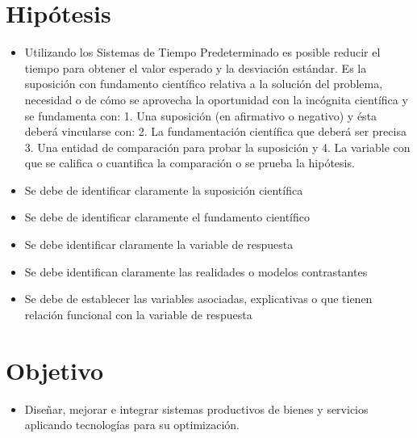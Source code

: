     \section{Hipótesis}
    
    \begin{itemize}
    \item Utilizando los Sistemas de Tiempo Predeterminado es posible reducir el tiempo para obtener el valor esperado y la desviación estándar.
    Es la suposición con fundamento científico relativa a la solución del problema, necesidad o de cómo se aprovecha la oportunidad con la incógnita científica y se fundamenta con: 1. Una suposición (en afirmativo o negativo) y ésta deberá vincularse con:
    2. La fundamentación científica que deberá ser precisa 3. Una entidad de comparación para probar la suposición y
    4. La variable con que se califica o cuantifica la comparación o se prueba la hipótesis.
    
        \item Se debe de identificar claramente la suposición científica
        \item Se debe de identificar claramente el fundamento científico
        \item Se debe identificar claramente la variable de respuesta
        \item Se debe identifican claramente las realidades o modelos contrastantes
        \item Se debe de establecer las variables asociadas, explicativas o que tienen relación funcional con la variable de respuesta
    \end{itemize}
    \section{Objetivo}
    
    \begin{itemize}
    \item Diseñar, mejorar e integrar sistemas productivos de bienes y servicios  aplicando tecnologías para su optimización.
    \end{itemize}
    

